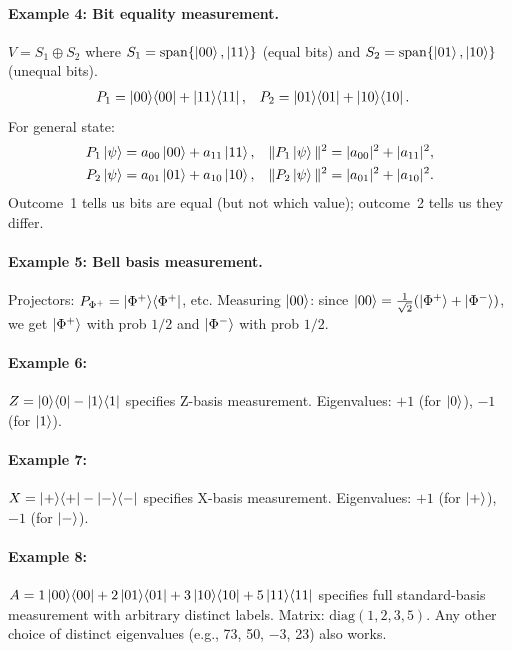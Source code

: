 \documentclass[10pt,a4paper]{article}
\begin{document}
\paragraph{Example 4: Bit equality measurement.}
$V=S_1\oplus S_2$ where $S_1=\mathrm{span}\{\ket{00},\ket{11}\}$ (equal bits) and $S_2=\mathrm{span}\{\ket{01},\ket{10}\}$ (unequal bits).
\begin{align*}
P_1 &= \ket{00}\!\bra{00}+\ket{11}\!\bra{11}, & P_2 &= \ket{01}\!\bra{01}+\ket{10}\!\bra{10}.
\end{align*}
For general state:
\begin{align*}
P_1\ket{\psi} &= a_{00}\ket{00}+a_{11}\ket{11}, & \|P_1\ket{\psi}\|^2 &= |a_{00}|^2+|a_{11}|^2,\\
P_2\ket{\psi} &= a_{01}\ket{01}+a_{10}\ket{10}, & \|P_2\ket{\psi}\|^2 &= |a_{01}|^2+|a_{10}|^2.
\end{align*}
Outcome~1 tells us bits are equal (but not which value); outcome~2 tells us they differ.

\paragraph{Example 5: Bell basis measurement.}
Projectors: $P_{\Phi^+}=\ket{\Phi^+}\!\bra{\Phi^+}$, etc. Measuring $\ket{00}$: since $\ket{00}=\frac{1}{\sqrt{2}}(\ket{\Phi^+}+\ket{\Phi^-})$, we get $\ket{\Phi^+}$ with prob $1/2$ and $\ket{\Phi^-}$ with prob $1/2$.

\paragraph{Example 6:} $Z=\ket{0}\!\bra{0}-\ket{1}\!\bra{1}$ specifies Z-basis measurement. Eigenvalues: $+1$ (for $\ket{0}$), $-1$ (for $\ket{1}$).

\paragraph{Example 7:} $X=\ket{+}\!\bra{+}-\ket{-}\!\bra{-}$ specifies X-basis measurement. Eigenvalues: $+1$ (for $\ket{+}$), $-1$ (for $\ket{-}$).

\paragraph{Example 8:} $A=1\ket{00}\!\bra{00}+2\ket{01}\!\bra{01}+3\ket{10}\!\bra{10}+5\ket{11}\!\bra{11}$ specifies full standard-basis measurement with arbitrary distinct labels. Matrix: $\mathrm{diag}(1,2,3,5)$. Any other choice of distinct eigenvalues (e.g., 73, 50, $-3$, 23) also works.
\end{document}
